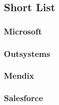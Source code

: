 \subsection{Short List}


\subsubsection{Microsoft}

\subsubsection{Outsystems}

\subsubsection{Mendix}

\subsubsection{Salesforce}

